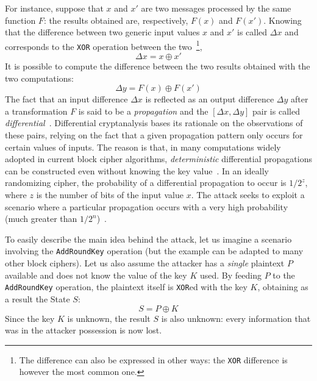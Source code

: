                 For instance, suppose that $x$ and $x'$ are two messages processed by the same function $F$: the results obtained are, respectively, $F(x)$ and $F(x')$.
                Knowing that the difference between two generic input values $x$ and $x'$ is called $\Delta x$ and corresponds to the \texttt{XOR} operation between the two~\footnote{The difference can also be expressed in other ways: the \texttt{XOR} difference is however the most common one.},
                \begin{equation}\label{eq:input_diff}
                    \Delta x = x \oplus x'
                \end{equation}
                It is possible to compute the difference between the two results obtained with the two computations:
                \begin{equation}\label{eq:output_diff}
                    \Delta y = F(x) \oplus F(x')
                \end{equation}
                The fact that an input difference $\Delta x$ is reflected as an output difference $\Delta y$ after a transformation $F$ is said to be a \emph{propagation} and the $[\Delta x, \Delta y]$ pair is called \emph{differential}~\cite{heys2002tutorial}. Differential cryptanalysis bases its rationale on the observations of these pairs, relying on the fact that a given propagation pattern only occurs for certain values of inputs. The reason is that, in many computations widely adopted in current block cipher algorithms, \emph{deterministic} differential propagations can be constructed even without knowing the key value~\cite{sakiyama2016security}. In an ideally randomizing cipher, the probability of a differential propagation to occur is $1/2^z$, where $z$ is the number of bits of the input value $x$. The attack seeks to exploit a scenario where a particular propagation occurs with a very high probability (much greater than $1/2^n$)~\cite{heys2002tutorial}.

                To easily describe the main idea behind the attack, let us imagine a scenario involving the \aes{} \texttt{AddRoundKey} operation (but the example can be adapted to many other block ciphers). Let us also assume the attacker has a \emph{single} plaintext $P$ available and does not know the value of the key $K$ used. By feeding $P$ to the \texttt{AddRoundKey} operation, the plaintext itself is \texttt{XOR}ed with the key $K$, obtaining as a result the State $S$:
                \begin{equation}
                    S = P \oplus K
                \end{equation}
                Since the key $K$ is unknown, the result $S$ is also unknown: every information that was in the attacker possession is now lost.

